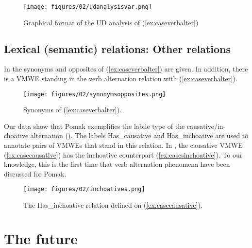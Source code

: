 \documentclass[output=paper,colorlinks,citecolor=brown]{langscibook}
\begin{document}
\begin{figure}
\texttt{[image: figures/02/udanalysisvar.png]}
\caption{Graphical format of the UD analysis of (\ref{ex:caseverbalter})}
\label{fig:chapterhandle:conllu}
\end{figure}


\subsection{Lexical (semantic) relations: Other relations}
\label{sec:synonymy}

In  the synonyms and opposites of (\ref{ex:caseverbalter}) are given. In addition, there is a VMWE standing in the verb alternation relation with  (\ref{ex:caseverbalter}).

\begin{figure}
\texttt{[image: figures/02/synonymsopposites.png]}
\caption{Synonyms of (\ref{ex:caseverbalter}).}
\label{fig:chapterhandle:synonyms}
\end{figure}

Our data show that Pomak exemplifies the labile type of the causative/in-choative alternation (). The labels Has\_causative and Has\_inchoative are used to annotate pairs of VMWEs that stand in this relation. In , the causative VMWE  (\ref{ex:casecausative}) has the inchoative counterpart  (\ref{ex:casesinchoative}). To our knowledge, this is the first time that verb alternation phenomena have been discussed for Pomak. 

\begin{figure}
\texttt{[image: figures/02/inchoatives.png]}
\caption{The Has\_inchoative relation defined on  (\ref{ex:casecausative}).}
\label{fig:chapterhandle:inchoatives}
\end{figure}



\section{The future}
\end{document}
